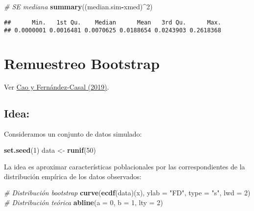 \documentclass[
]{book}
\newenvironment{Shaded}{\begin{snugshade}}{\end{snugshade}}
\newcommand{\CommentTok}[1]{\textcolor[rgb]{0.56,0.35,0.01}{\textit{#1}}}
\newcommand{\DataTypeTok}[1]{\textcolor[rgb]{0.13,0.29,0.53}{#1}}
\newcommand{\DecValTok}[1]{\textcolor[rgb]{0.00,0.00,0.81}{#1}}
\newcommand{\KeywordTok}[1]{\textcolor[rgb]{0.13,0.29,0.53}{\textbf{#1}}}
\newcommand{\NormalTok}[1]{#1}
\newcommand{\OperatorTok}[1]{\textcolor[rgb]{0.81,0.36,0.00}{\textbf{#1}}}
\newcommand{\StringTok}[1]{\textcolor[rgb]{0.31,0.60,0.02}{#1}}
\theoremstyle{break}
\theoremstyle{definition}
\theoremstyle{definition}
\theoremstyle{definition}
\theoremstyle{remark}
\begin{document}
\begin{enumerate}
\begin{Shaded}
\begin{Highlighting}[]
\CommentTok{# SE mediana}
\KeywordTok{summary}\NormalTok{((median.sim}\OperatorTok{-}\NormalTok{xmed)}\OperatorTok{^}\DecValTok{2}\NormalTok{) }
\end{Highlighting}
\end{Shaded}

\begin{verbatim}
##      Min.   1st Qu.    Median      Mean   3rd Qu.      Max. 
## 0.0000001 0.0016481 0.0070625 0.0188654 0.0243903 0.2618368
\end{verbatim}
\end{enumerate}

\hypertarget{remuestreo-bootstrap}{%
\section{Remuestreo Bootstrap}\label{remuestreo-bootstrap}}

Ver \href{https://rubenfcasal.github.io/book_remuestreo/}{Cao y Fernández-Casal (2019)}.

\hypertarget{idea}{%
\subsection{Idea:}\label{idea}}

Consideramos un conjunto de datos simulado:

\begin{Shaded}
\begin{Highlighting}[]
\KeywordTok{set.seed}\NormalTok{(}\DecValTok{1}\NormalTok{)}
\NormalTok{data <-}\StringTok{ }\KeywordTok{runif}\NormalTok{(}\DecValTok{50}\NormalTok{)}
\end{Highlighting}
\end{Shaded}

La idea es aproximar características poblacionales por las correspondientes de la distribución empírica de los datos observados:

\begin{Shaded}
\begin{Highlighting}[]
 \CommentTok{# Distribución bootstrap}
\KeywordTok{curve}\NormalTok{(}\KeywordTok{ecdf}\NormalTok{(data)(x), }\DataTypeTok{ylab =} \StringTok{"FD"}\NormalTok{, }\DataTypeTok{type =} \StringTok{"s"}\NormalTok{, }\DataTypeTok{lwd =} \DecValTok{2}\NormalTok{)}
\CommentTok{# Distribución teórica}
\KeywordTok{abline}\NormalTok{(}\DataTypeTok{a =} \DecValTok{0}\NormalTok{, }\DataTypeTok{b =} \DecValTok{1}\NormalTok{, }\DataTypeTok{lty =} \DecValTok{2}\NormalTok{) }
\end{Highlighting}
\end{Shaded}
\end{document}

